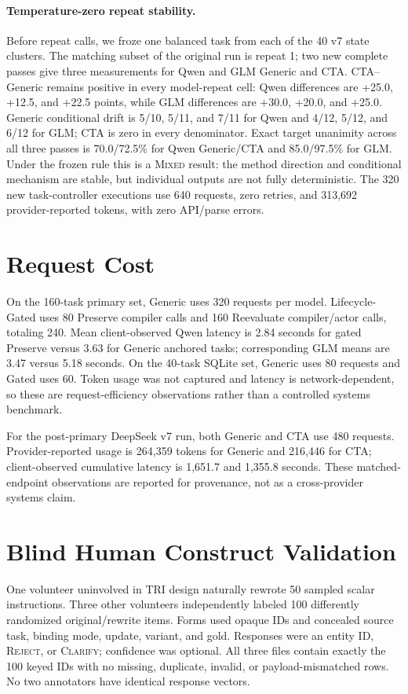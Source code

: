 \documentclass[10pt]{article}
\begin{document}
\paragraph{Temperature-zero repeat stability.}
Before repeat calls, we froze one balanced task from each of the 40 v7 state clusters. The matching
subset of the original run is repeat 1; two new complete passes give three measurements for Qwen
and GLM Generic and CTA. CTA--Generic remains positive in every model-repeat cell: Qwen differences
are +25.0, +12.5, and +22.5 points, while GLM differences are +30.0, +20.0, and +25.0. Generic
conditional drift is 5/10, 5/11, and 7/11 for Qwen and 4/12, 5/12, and 6/12 for GLM; CTA is zero
in every denominator. Exact target unanimity across all three passes is 70.0/72.5\% for Qwen
Generic/CTA and 85.0/97.5\% for GLM. Under the frozen rule this is a \textsc{Mixed} result: the
method direction and conditional mechanism are stable, but individual outputs are not fully
deterministic. The 320 new task-controller executions use 640 requests, zero retries, and 313,692
provider-reported tokens, with zero API/parse errors.

\section{Request Cost}
On the 160-task primary set, Generic uses 320 requests per model. Lifecycle-Gated uses 80
Preserve compiler calls and 160 Reevaluate compiler/actor calls, totaling 240. Mean
client-observed Qwen latency is 2.84 seconds for gated Preserve versus 3.63 for Generic
anchored tasks; corresponding GLM means are 3.47 versus 5.18 seconds. On the 40-task SQLite
set, Generic uses 80 requests and Gated uses 60. Token usage was not captured and latency is
network-dependent, so these are request-efficiency observations rather than a controlled
systems benchmark.

For the post-primary DeepSeek v7 run, both Generic and CTA use 480 requests. Provider-reported
usage is 264,359 tokens for Generic and 216,446 for CTA; client-observed cumulative latency is
1,651.7 and 1,355.8 seconds. These matched-endpoint observations are reported for provenance,
not as a cross-provider systems claim.

\section{Blind Human Construct Validation}
One volunteer uninvolved in TRI design naturally rewrote 50 sampled scalar instructions.
Three other volunteers independently labeled 100 differently randomized original/rewrite
items. Forms used opaque IDs and concealed source task, binding mode, update, variant, and
gold. Responses were an entity ID, \textsc{Reject}, or \textsc{Clarify}; confidence was
optional. All three files contain exactly the 100 keyed IDs with no missing, duplicate,
invalid, or payload-mismatched rows. No two annotators have identical response vectors.
\end{document}
